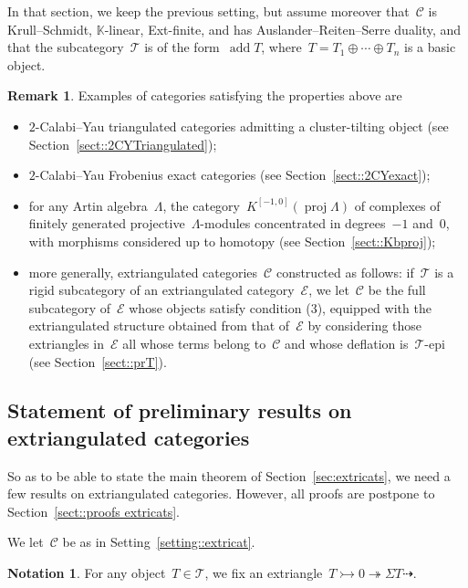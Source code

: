 \documentclass{amsart}
\theoremstyle{definition}
\newtheorem{remark}[theorem]{Remark}
\newtheorem{notation}[theorem]{Notation}
\newcommand{\field}{\mathbb{K}}
\newcommand{\cat}{\mathcal{C}}
\newcommand{\susp}{\Sigma}
\newcommand{\add}{\operatorname{add}}
\newcommand{\proj}{\operatorname{proj}}
\newcommand{\tc}{\mathcal{T}}
\newcommand{\ec}{\mathcal{E}}
\newcommand{\infl}{\rightarrowtail}
\newcommand{\defl}{\twoheadrightarrow}
\begin{document}
In that section, we keep the previous setting, but assume moreover that~$\cat$ is Krull--Schmidt, $\field$-linear, Ext-finite, and has Auslander--Reiten--Serre duality, and that the subcategory~$\tc$ is of the form~$\add T$, where~$T=T_1\oplus\cdots\oplus T_n$ is a basic object.

\begin{remark}\label{remark::examples extricats}
 Examples of categories satisfying the properties above are
 \begin{itemize}
  \item $2$-Calabi--Yau triangulated categories admitting a cluster-tilting object (see Section~\ref{sect::2CYTriangulated});
  \item $2$-Calabi--Yau Frobenius exact categories (see Section~\ref{sect::2CYexact});
  \item for any Artin algebra~$\Lambda$, the category~$K^{[-1,0]}(\proj \Lambda)$ of complexes of finitely generated projective~$\Lambda$-modules concentrated in degrees~$-1$ and~$0$, with morphisms considered up to homotopy (see Section~\ref{sect::Kbproj});
  \item more generally, extriangulated categories~$\cat$ constructed as follows: if~$\tc$ is a rigid subcategory of an extriangulated category~$\ec$, we let~$\cat$ be the full subcategory of~$\ec$ whose objects satisfy condition (3), equipped with the extriangulated structure obtained from that of~$\ec$ by considering those extriangles in~$\ec$ all whose terms belong to~$\cat$ and whose deflation is~$\tc$-epi (see Section~\ref{sect::prT}).
 \end{itemize}
\end{remark}



\subsection{Statement of preliminary results on extriangulated categories}
\label{sect::prelim on extricats}

So as to be able to state the main theorem of Section~\ref{sec:extricats}, we need a few results on extriangulated categories.
However, all proofs are postpone to Section~\ref{sect::proofs extricats}.

We let~$\cat$ be as in Setting~\ref{setting::extricat}.

\begin{notation}
For any object~$T\in\tc$, we fix an extriangle~$T\infl 0 \defl \susp T \dashrightarrow$.
\end{notation}
\end{document}
